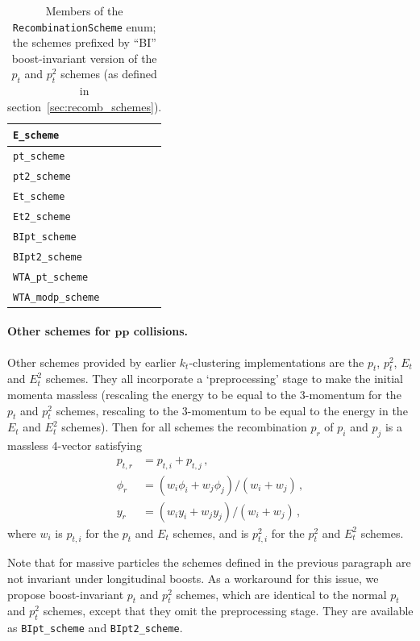 \documentclass[12pt,a4]{article}
\newcommand{\ttt}[1]{{\small\texttt{#1}}}
\begin{document}
\begin{table}
  \centering
  \begin{tabular}{|l|}\hline
    \ttt{E\_scheme}     \\\hline
    \ttt{pt\_scheme}    \\\hline
    \ttt{pt2\_scheme}   \\\hline
    \ttt{Et\_scheme}    \\\hline
    \ttt{Et2\_scheme}   \\\hline
    \ttt{BIpt\_scheme}  \\\hline
    \ttt{BIpt2\_scheme} \\\hline
    \ttt{WTA\_pt\_scheme} \\\hline
    \ttt{WTA\_modp\_scheme} \\\hline
  \end{tabular}
  \caption{Members of the \ttt{RecombinationScheme} enum; the schemes
    prefixed by ``BI''
    boost-invariant version of the $p_t$ and $p_t^2$ schemes
    (as defined in section~\ref{sec:recomb_schemes}).}
  \label{tab:RecombSchemes}
\end{table}

\paragraph{Other schemes for $\boldsymbol{pp}$ collisions.} Other
schemes provided by earlier $k_t$-clustering implementations
\cite{KtClus,KtJet} are the $p_t$, $p_t^2$, $E_t$ and $E_t^2$ schemes. They
all incorporate a `preprocessing' stage to make the initial momenta
massless (rescaling the energy to be equal to the 3-momentum for the
$p_t$ and $p_t^2$ schemes, rescaling to the 3-momentum to be equal to
the energy in the $E_t$ and $E_t^2$ schemes). Then for all schemes the
recombination $p_r$ of $p_i$ and $p_j$ is a massless 4-vector
satisfying
\begin{subequations}
  \label{eq:recomb-weights}
  \begin{align}
    p_{t,r} &= p_{t,i} + p_{t,j}\,,\\
    \phi_r &= (w_i \phi_i + w_j \phi_j)/(w_i + w_j)\,,\\
    y_r &= (w_i y_i + w_j y_j)/(w_i + w_j)\,,
  \end{align}
\end{subequations}
where $w_i$ is $p_{t,i}$ for the $p_t$ and $E_t$ schemes, and is
$p_{t,i}^2$ for the $p_t^2$ and $E_t^2$ schemes. 

Note that for massive particles the schemes defined in the previous
paragraph are not invariant under longitudinal boosts. 
%
As a workaround for this issue, we propose boost-invariant $p_t$ and
$p_t^2$ schemes, which are identical to the normal $p_t$ and $p_t^2$
schemes, except that they omit the preprocessing stage. They are
available as \ttt{BIpt\_scheme} and \ttt{BIpt2\_scheme}.
\end{document}
